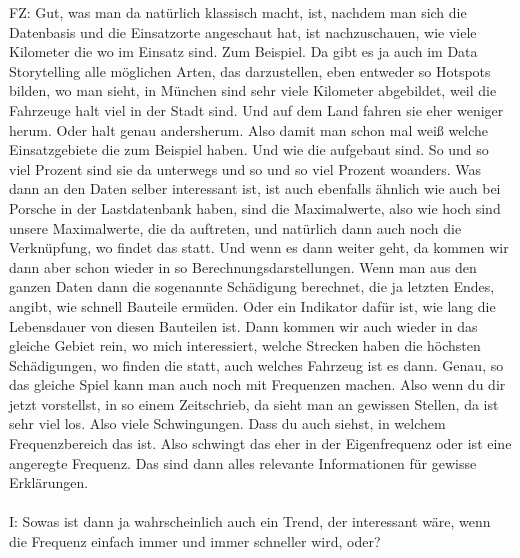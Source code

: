 \begin{linenumbers}
FZ: Gut, was man da natürlich klassisch macht, ist, nachdem man sich die Datenbasis und die Einsatzorte angeschaut hat, ist nachzuschauen, wie viele Kilometer die wo im Einsatz sind. Zum Beispiel. Da gibt es ja auch im Data Storytelling alle möglichen Arten, das darzustellen, eben entweder so Hotspots bilden, wo man sieht, in München sind sehr viele Kilometer abgebildet, weil die Fahrzeuge halt viel in der Stadt sind. Und auf dem Land fahren sie eher weniger herum. Oder halt genau andersherum. Also damit man schon mal weiß welche Einsatzgebiete die zum Beispiel haben. Und wie die aufgebaut sind. So und so viel Prozent sind sie da unterwegs und so und so viel Prozent woanders. Was dann an den Daten selber interessant ist, ist auch ebenfalls ähnlich wie auch bei Porsche in der Lastdatenbank haben, sind die Maximalwerte, also wie hoch sind unsere Maximalwerte, die da auftreten, und natürlich dann auch noch die Verknüpfung, wo findet das statt. Und wenn es dann weiter geht, da kommen wir dann aber schon wieder in so Berechnungsdarstellungen. Wenn man aus den ganzen Daten dann die sogenannte Schädigung berechnet, die ja letzten Endes, angibt, wie schnell Bauteile ermüden. Oder ein Indikator dafür ist, wie lang die Lebensdauer von diesen Bauteilen ist. Dann kommen wir auch wieder in das gleiche Gebiet rein, wo mich interessiert, welche Strecken haben die höchsten Schädigungen, wo finden die statt, auch welches Fahrzeug ist es dann. Genau, so das gleiche Spiel kann man auch noch mit Frequenzen machen. Also wenn du dir jetzt vorstellst, in so einem Zeitschrieb, da sieht man an gewissen Stellen, da ist sehr viel los. Also viele Schwingungen. Dass du auch siehst, in welchem Frequenzbereich das ist. Also schwingt das eher in der Eigenfrequenz oder ist eine angeregte Frequenz. Das sind dann alles relevante Informationen für gewisse Erklärungen.\\\\
I: Sowas ist dann ja wahrscheinlich auch ein Trend, der interessant wäre, wenn die Frequenz einfach immer und immer schneller wird, oder?\\\\

\end{linenumbers}
